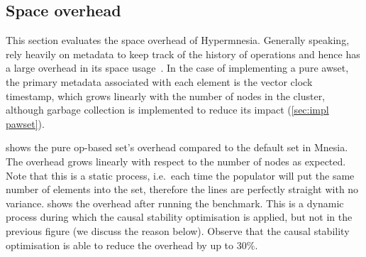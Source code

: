 \subsection{Space overhead} \label{sec:eval space}

This section evaluates the space overhead of Hypermnesia. Generally speaking,
 rely heavily on metadata to keep track of the history of
operations and hence has a large overhead in its space usage~\cite{bauwens2019crdtmemory}. 
In the case of implementing a pure \acrshort{awset}, the primary
metadata associated with each element is the vector clock timestamp, which
grows linearly with the number of nodes in the cluster, although
garbage collection is implemented to reduce its impact (\cref{sec:impl pawset}).

 shows the pure op-based set's overhead
compared to the default set in Mnesia. The overhead grows linearly with respect
to the number of nodes as expected. Note that this is a static process, i.e.\ each
time the populator will put the same number of elements into the set, therefore
the lines are perfectly straight with no variance.
 shows the
overhead after running the benchmark. This is a dynamic process during which
the causal stability optimisation is applied, but not in the previous
figure (we discuss the reason below). Observe that the causal stability optimisation
is able to reduce the overhead by up to \(30\%\).

